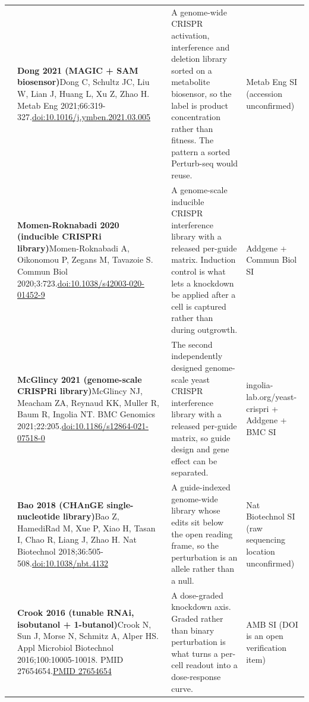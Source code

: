 \begin{landscape}
\begin{longtable}{@{}r@{\hspace{4pt}} L{86mm} L{92mm} L{62mm}@{}}
 & \textbf{Dong 2021 (MAGIC + SAM biosensor)}\newline Dong C, Schultz JC, Liu W, Lian J, Huang L, Xu Z, Zhao H. Metab Eng 2021;66:319-327.\newline \href{https://doi.org/10.1016/j.ymben.2021.03.005}{doi:10.1016/\allowbreak j.ymben.2021.03.005} & A genome-wide CRISPR activation, interference and deletion library sorted on a metabolite biosensor, so the label is product concentration rather than fitness. The pattern a sorted Perturb-seq would reuse. & Metab Eng SI (accession unconfirmed) \\
 & \textbf{Momen-Roknabadi 2020 (inducible CRISPRi library)}\newline Momen-Roknabadi A, Oikonomou P, Zegans M, Tavazoie S. Commun Biol 2020;3:723.\newline \href{https://doi.org/10.1038/s42003-020-01452-9}{doi:10.1038/\allowbreak s42003-020-01452-9} & A genome-scale inducible CRISPR interference library with a released per-guide matrix. Induction control is what lets a knockdown be applied after a cell is captured rather than during outgrowth. & Addgene + Commun Biol SI \\
 & \textbf{McGlincy 2021 (genome-scale CRISPRi library)}\newline McGlincy NJ, Meacham ZA, Reynaud KK, Muller R, Baum R, Ingolia NT. BMC Genomics 2021;22:205.\newline \href{https://doi.org/10.1186/s12864-021-07518-0}{doi:10.1186/\allowbreak s12864-021-07518-0} & The second independently designed genome-scale yeast CRISPR interference library with a released per-guide matrix, so guide design and gene effect can be separated. & ingolia-lab.org/\allowbreak yeast-crispri + Addgene + BMC SI \\
 & \textbf{Bao 2018 (CHAnGE single-nucleotide library)}\newline Bao Z, HamediRad M, Xue P, Xiao H, Tasan I, Chao R, Liang J, Zhao H. Nat Biotechnol 2018;36:505-508.\newline \href{https://doi.org/10.1038/nbt.4132}{doi:10.1038/\allowbreak nbt.4132} & A guide-indexed genome-wide library whose edits sit below the open reading frame, so the perturbation is an allele rather than a null. & Nat Biotechnol SI (raw sequencing location unconfirmed) \\
 & \textbf{Crook 2016 (tunable RNAi, isobutanol + 1-butanol)}\newline Crook N, Sun J, Morse N, Schmitz A, Alper HS. Appl Microbiol Biotechnol 2016;100:10005-10018. PMID 27654654.\newline \href{https://pubmed.ncbi.nlm.nih.gov/27654654/}{PMID 27654654} & A dose-graded knockdown axis. Graded rather than binary perturbation is what turns a per-cell readout into a dose-response curve. & AMB SI (DOI is an open verification item) \\

\end{longtable}
\end{landscape}
